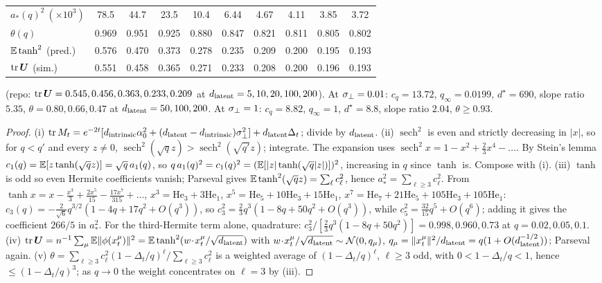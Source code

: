 \begin{lemma}
\begin{center}
\begin{tabular}{lccccccccc}
$a_*(q)^2\ (\times10^3)$ & 78.5 & 44.7 & 23.5 & 10.4 & 6.44 & 4.67 & 4.11 & 3.85 & 3.72\\
$\theta(q)$ & 0.969 & 0.951 & 0.925 & 0.880 & 0.847 & 0.821 & 0.811 & 0.805 & 0.802\\
$\mathbb{E}\tanh^2$ (pred.) & 0.576 & 0.470 & 0.373 & 0.278 & 0.235 & 0.209 & 0.200 & 0.195 & 0.193\\
$\operatorname{tr}\bm{U}$ (sim.) & 0.551 & 0.458 & 0.365 & 0.271 & 0.233 & 0.208 & 0.200 & 0.196 & 0.193
\end{tabular}
\end{center}
(repo: $\operatorname{tr}\bm{U}=0.545,0.456,0.363,0.233,0.209$ at $d_{\mathrm{latent}}=5,10,20,100,200$). At $\sigma_{\perp}=0.01$: $c_q=13.72$, $q_\infty=0.0199$, $d^\star=690$, slope ratio $5.35$, $\theta=0.80,0.66,0.47$ at $d_{\mathrm{latent}}=50,100,200$. At $\sigma_{\perp}=1$: $c_q=8.82$, $q_\infty=1$, $d^\star=8.8$, slope ratio $2.04$, $\theta\ge0.93$.
\end{lemma}
\begin{proof}
(i) $\operatorname{tr}M_t=e^{-2t}[d_{\mathrm{intrinsic}}\alpha_0^2+(d_{\mathrm{latent}}-d_{\mathrm{intrinsic}})\sigma_{\perp}^2]+d_{\mathrm{latent}}\Delta_t$; divide by $d_{\mathrm{latent}}$. (ii) $\operatorname{sech}^2$ is even and strictly decreasing in $|x|$, so for $q<q'$ and every $z\ne0$, $\operatorname{sech}^2(\sqrt qz)>\operatorname{sech}^2(\sqrt{q'}z)$; integrate. The expansion uses $\operatorname{sech}^2x=1-x^2+\tfrac23x^4-\dots$. By Stein's lemma $c_1(q)=\mathbb{E}[z\tanh(\sqrt qz)]=\sqrt q\,a_1(q)$, so $q\,a_1(q)^2=c_1(q)^2=(\mathbb{E}[|z|\tanh(\sqrt q|z|)])^2$, increasing in $q$ since $\tanh$ is. Compose with (i). (iii) $\tanh$ is odd so even Hermite coefficients vanish; Parseval gives $\mathbb{E}\tanh^2(\sqrt qz)=\sum_\ell c_\ell^2$, hence $a_*^2=\sum_{\ell\ge3}c_\ell^2$. From $\tanh x=x-\tfrac{x^3}3+\tfrac{2x^5}{15}-\tfrac{17x^7}{315}+\dots$, $x^3=\mathrm{He}_3+3\mathrm{He}_1$, $x^5=\mathrm{He}_5+10\mathrm{He}_3+15\mathrm{He}_1$, $x^7=\mathrm{He}_7+21\mathrm{He}_5+105\mathrm{He}_3+105\mathrm{He}_1$: $c_3(q)=-\tfrac{2}{\sqrt6}q^{3/2}(1-4q+17q^2+O(q^3))$, so $c_3^2=\tfrac23q^3(1-8q+50q^2+O(q^3))$, while $c_5^2=\tfrac{32}{15}q^5+O(q^6)$; adding it gives the coefficient $266/5$ in $a_*^2$. For the third-Hermite term alone, quadrature: $c_3^2/[\tfrac23q^3(1-8q+50q^2)]=0.998,0.960,0.73$ at $q=0.02,0.05,0.1$. (iv) $\operatorname{tr}\bm{U}=n^{-1}\sum_\mu\mathbb{E}\|\phi(x^\mu_t)\|^2=\mathbb{E}\tanh^2(w\!\cdot\!x^\mu_t/\sqrt{d_{\mathrm{latent}}})$ with $w\!\cdot\!x^\mu_t/\sqrt{d_{\mathrm{latent}}}\sim\mathcal N(0,q_\mu)$, $q_\mu=\|x^\mu_t\|^2/d_{\mathrm{latent}}=q(1+O(d_{\mathrm{latent}}^{-1/2}))$; Parseval again. (v) $\theta=\sum_{\ell\ge3}c_\ell^2(1-\Delta_t/q)^\ell/\sum_{\ell\ge3}c_\ell^2$ is a weighted average of $(1-\Delta_t/q)^\ell$, $\ell\ge3$ odd, with $0<1-\Delta_t/q<1$, hence $\le(1-\Delta_t/q)^3$; as $q\to0$ the weight concentrates on $\ell=3$ by (iii).
\end{proof}

